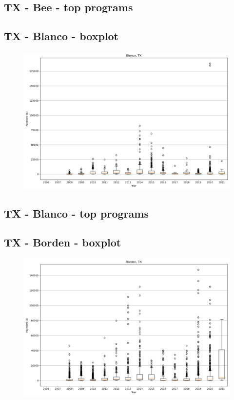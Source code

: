 \subsection*{TX - Bee - top programs}

\newpage
\subsection*{TX - Blanco - boxplot}
\begin{figure}[h]
\centering
\includegraphics[width=7in]{../output/boxplots/counties/Blanco-TX_boxplot.png}
\end{figure}


\subsection*{TX - Blanco - top programs}

\newpage
\subsection*{TX - Borden - boxplot}
\begin{figure}[h]
\centering
\includegraphics[width=7in]{../output/boxplots/counties/Borden-TX_boxplot.png}
\end{figure}


